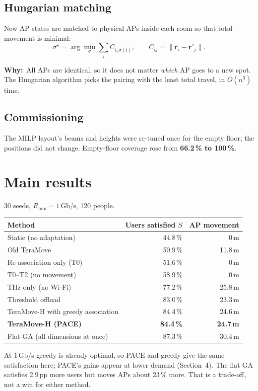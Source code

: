 \documentclass[11pt,a4paper]{article}
\newcommand{\Rmin}{R_{\min}}
\newcommand{\why}[1]{\par\smallskip\noindent\begin{minipage}{\linewidth}\small
  \textcolor{whyc}{\textbf{Why:}}~#1\end{minipage}\par\medskip}
\begin{document}
\subsection{Hungarian matching}
New AP states are matched to physical APs inside each room so that total movement is
minimal:
\[
\sigma^\star=\arg\min_{\sigma}\sum_i C_{i,\sigma(i)},
\qquad
C_{ij}=\big\lVert\mathbf{r}_i-\mathbf{r}'_j\big\rVert .
\]
\why{All APs are identical, so it does not matter \emph{which} AP goes to a new spot. The Hungarian algorithm picks the pairing with the least total travel, in $O(n^3)$ time.}

\subsection{Commissioning}
The MILP layout's beams and heights were re-tuned once for the empty floor; the positions
did not change. Empty-floor coverage rose from \textbf{66.2\,\% to 100\,\%}.

\section{Main results}
30 seeds, $\Rmin=1$\,Gb/s, 120 people.
\begin{center}
\begin{tabular}{@{}lrr@{}}
\toprule
Method & Users satisfied $S$ & AP movement\\
\midrule
Static (no adaptation) & 44.8\,\% & 0\,m\\
Old TeraMove & 50.9\,\% & 11.8\,m\\
Re-association only (T0) & 51.6\,\% & 0\,m\\
T0--T2 (no movement) & 58.9\,\% & 0\,m\\
THz only (no Wi-Fi) & 77.2\,\% & 25.8\,m\\
Threshold offload & 83.0\,\% & 23.3\,m\\
TeraMove-H with greedy association & 84.4\,\% & 24.6\,m\\
\textbf{TeraMove-H (PACE)} & \textbf{84.4\,\%} & \textbf{24.7\,m}\\
Flat GA (all dimensions at once) & 87.3\,\% & 30.4\,m\\
\bottomrule
\end{tabular}
\end{center}
At 1\,Gb/s greedy is already optimal, so PACE and greedy give the same satisfaction here; PACE's gains appear at lower demand (Section~4). The flat GA satisfies 2.9\,pp more users but moves APs about 23\,\% more. That is a
trade-off, not a win for either method.
\end{document}
